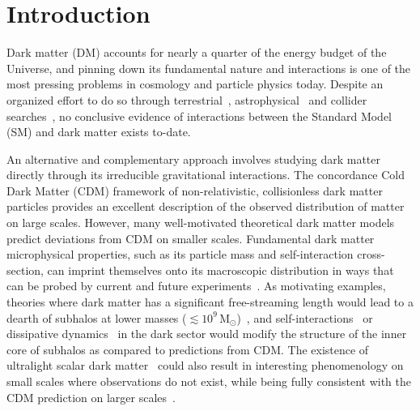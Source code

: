 \documentclass[prd,aps,10pt,nofootinbib,twocolumn,superscriptaddress,preprintnumbers,balancelastpage,longbibliography]{revtex4-1}
\begin{document}
\tableofcontents

\section{Introduction}

Dark matter (DM) accounts for nearly a quarter of the energy budget of the Universe, and pinning down its fundamental nature and interactions is one of the most pressing problems in cosmology and particle physics today. Despite an organized effort to do so through terrestrial~\cite{2018PhRvL.121k1302A,2017PhRvL.119r1302C,2017PhRvL.118b1303A}, astrophysical~\cite{2017ApJ...834..110A,2018PhRvD..98l3004C,2018PhRvL.120j1101L} and collider searches~\cite{2019arXiv190301400A,2017PhLB..769..520S}, no conclusive evidence of interactions between the Standard Model (SM) and dark matter exists to-date.

An alternative and complementary approach involves studying dark matter directly through its irreducible gravitational interactions. The concordance Cold Dark Matter (CDM) framework of non-relativistic, collisionless dark matter particles provides an excellent description of the observed distribution of matter on large scales. However, many well-motivated theoretical dark matter models predict deviations from CDM on smaller scales. Fundamental dark matter microphysical properties, such as its particle mass and self-interaction cross-section, can imprint themselves onto its macroscopic distribution in ways that can be probed by current and future experiments~\cite{2019arXiv190201055D}. As motivating examples, theories where dark matter has a significant free-streaming length would lead to a dearth of subhalos at lower masses ($\lesssim 10^9\,\mathrm{M}_\odot$)~\cite{1983ApJ...274..443B,2001ApJ...556...93B,astro-ph/0004381,0807.0622,1008.0992}, and self-interactions~\cite{1508.03339,1311.6524,1211.6426,1208.3026,1201.5892,1805.03203,1904.10539} or dissipative dynamics~\cite{1706.04195,1702.05482,1707.03829,1303.1521,1512.05349} in the dark sector would modify the structure of the inner core of subhalos as compared to predictions from CDM. The existence of ultralight scalar dark matter~\cite{astro-ph/0003365,2017PhRvD..95d3541H} could also result in interesting phenomenology on small scales where observations do not exist, while being fully consistent with the CDM prediction on larger scales~\cite{1705.05845,1608.02575,2019ApJ...871...28B,1705.05845}.
\end{document}
